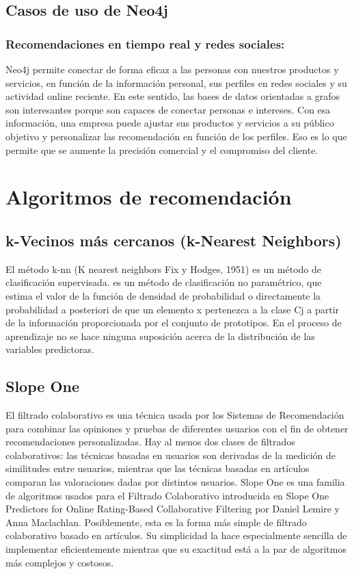 \subsection{Casos de uso de Neo4j}
\subsubsection{Recomendaciones en tiempo real y redes sociales:}
	Neo4j permite conectar de forma eficaz a las personas con nuestros productos y servicios, en función de la información personal, sus perfiles en redes sociales y su actividad online reciente. En este sentido, las bases de datos orientadas a grafos son interesantes porque son capaces de conectar personas e intereses.
	Con esa información, una empresa puede ajustar sus productos y servicios a su público objetivo y personalizar las recomendación en función de los perfiles. Eso es lo que permite que se aumente la precisión comercial y el compromiso del cliente.\cite{25}
\newpage
\section{Algoritmos de recomendación}
\subsection{k-Vecinos más cercanos (k-Nearest Neighbors)}
	El método k-nn (K nearest neighbors Fix y Hodges, 1951) es un método de clasificación supervisada. es un método de clasificación no paramétrico, que estima el valor de la función de densidad de probabilidad o directamente la probabilidad a posteriori de que un elemento x pertenezca a la clase Cj a partir de la información proporcionada por el conjunto de prototipos. En el proceso de aprendizaje no se hace ninguna suposición acerca de la distribución de las variables predictoras.

\subsection{Slope One}
	El filtrado colaborativo es una técnica usada por los Sistemas de Recomendación para combinar las opiniones y pruebas de diferentes usuarios con el fin de obtener recomendaciones personalizadas. Hay al menos dos clases de filtrados colaborativos: las técnicas basadas en usuarios son derivadas de la medición de similitudes entre usuarios, mientras que las técnicas basadas en artículos comparan las valoraciones dadas por distintos usuarios. Slope One es una familia de algoritmos usados para el Filtrado Colaborativo introducida en Slope One Predictors for Online Rating-Based Collaborative Filtering por Daniel Lemire y Anna Maclachlan. Posiblemente, esta es la forma más simple de filtrado colaborativo basado en artículos. Su simplicidad la hace especialmente sencilla de implementar eficientemente mientras que su exactitud está a la par de algoritmos más complejos y costosos.
